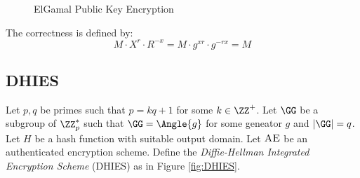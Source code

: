 \documentclass[11pt,a4paper]{article}
\begin{document}
\begin{figure}[H]
\begin{pchstack}[ center , boxed, space=0.5cm]
		

			
\end{pchstack}
\caption{ElGamal Public Key Encryption}
\label{fig:ElGamal}
\end{figure}

The correctness is defined by: 
$$
M \cdot X^r \cdot R^{-x} = M \cdot g^{xr} \cdot g^{-rx} = M 
$$


\subsection{DHIES}
Let $p,q$ be primes such that $p = kq + 1$ for some $k \in \ZZ^+$. Let $\GG$ be a subgroup of $\ZZ_p^*$ such that $\GG = \Angle{g}$ for some geneator $g$ and $|\GG| = q$. Let $H$ be a hash function with suitable output domain. Let $\textsc{AE}$ be an authenticated encryption scheme. Define the \textit{Diffie-Hellman Integrated Encryption Scheme} (DHIES) as in Figure \ref{fig:DHIES}. 
\end{document}
